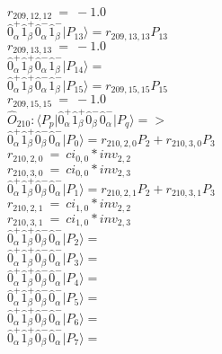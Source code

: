 \documentclass[14pt]{article}
\begin{document}
    ${r}_{209,12,12}\ =\ -1.0 $ \\ 
    $ \hat{0}_{\alpha}^{+}\hat{1}_{\beta}^{+}\hat{0}_{\alpha}^{-}\hat{1}_{\beta}^{-} \vert{P_{13}}\rangle = {r}_{209,13,13}P_{13} $ \\ 
    ${r}_{209,13,13}\ =\ -1.0 $ \\ 
    $ \hat{0}_{\alpha}^{+}\hat{1}_{\beta}^{+}\hat{0}_{\alpha}^{-}\hat{1}_{\beta}^{-} \vert{P_{14}}\rangle =  $ \\ 
    $ \hat{0}_{\alpha}^{+}\hat{1}_{\beta}^{+}\hat{0}_{\alpha}^{-}\hat{1}_{\beta}^{-} \vert{P_{15}}\rangle = {r}_{209,15,15}P_{15} $ \\ 
    ${r}_{209,15,15}\ =\ -1.0 $ \\ 
    
    $\hat{O}_{210}:  \langle{P_p}\vert \hat{0}_{\alpha}^{+}\hat{1}_{\beta}^{+}\hat{0}_{\beta}^{-}\hat{0}_{\alpha}^{-} \vert{P_q}\rangle => $ \\ 
    $ \hat{0}_{\alpha}^{+}\hat{1}_{\beta}^{+}\hat{0}_{\beta}^{-}\hat{0}_{\alpha}^{-} \vert{P_{0}}\rangle = {r}_{210,2,0}P_{2}+{r}_{210,3,0}P_{3} $ \\ 
    ${r}_{210,2,0}\ =\ {ci}_{0,0}*{inv}_{2,2} $ \\ 
    ${r}_{210,3,0}\ =\ {ci}_{0,0}*{inv}_{2,3} $ \\ 
    $ \hat{0}_{\alpha}^{+}\hat{1}_{\beta}^{+}\hat{0}_{\beta}^{-}\hat{0}_{\alpha}^{-} \vert{P_{1}}\rangle = {r}_{210,2,1}P_{2}+{r}_{210,3,1}P_{3} $ \\ 
    ${r}_{210,2,1}\ =\ {ci}_{1,0}*{inv}_{2,2} $ \\ 
    ${r}_{210,3,1}\ =\ {ci}_{1,0}*{inv}_{2,3} $ \\ 
    $ \hat{0}_{\alpha}^{+}\hat{1}_{\beta}^{+}\hat{0}_{\beta}^{-}\hat{0}_{\alpha}^{-} \vert{P_{2}}\rangle =  $ \\ 
    $ \hat{0}_{\alpha}^{+}\hat{1}_{\beta}^{+}\hat{0}_{\beta}^{-}\hat{0}_{\alpha}^{-} \vert{P_{3}}\rangle =  $ \\ 
    $ \hat{0}_{\alpha}^{+}\hat{1}_{\beta}^{+}\hat{0}_{\beta}^{-}\hat{0}_{\alpha}^{-} \vert{P_{4}}\rangle =  $ \\ 
    $ \hat{0}_{\alpha}^{+}\hat{1}_{\beta}^{+}\hat{0}_{\beta}^{-}\hat{0}_{\alpha}^{-} \vert{P_{5}}\rangle =  $ \\ 
    $ \hat{0}_{\alpha}^{+}\hat{1}_{\beta}^{+}\hat{0}_{\beta}^{-}\hat{0}_{\alpha}^{-} \vert{P_{6}}\rangle =  $ \\ 
    $ \hat{0}_{\alpha}^{+}\hat{1}_{\beta}^{+}\hat{0}_{\beta}^{-}\hat{0}_{\alpha}^{-} \vert{P_{7}}\rangle =  $ \\ 
\end{document}
